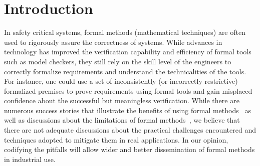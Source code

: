 
\section{Introduction}
\label{sec:intro}
\vspace{-0.1in}

In safety critical systems, formal methods (mathematical techniques) are often used to rigorously assure the correctness of systems. %
While advances in technology has improved the verification capability and efficiency of formal tools such as model checkers, they still rely on the skill level of the engineers to correctly formalize requirements
and understand the technicalities of the tools. For instance, one could use a set of inconsistently (or incorrectly restrictive) formalized premises to prove requirements using formal tools and gain misplaced confidence about the successful but meaningless verification. While there are numerous success stories that illustrate the benefits of using formal methods~\cite{Miller03:shalls,Whalen07:FMICS} as well as discussions about the limitations of formal methods~\cite{kneuper1997limits,hall1990seven}, we believe that %
there are not adequate discussions about the practical challenges encountered and techniques adopted to mitigate them in real applications.
In our opinion, codifying the pitfalls will allow wider and better dissemination of formal methods in industrial use.

